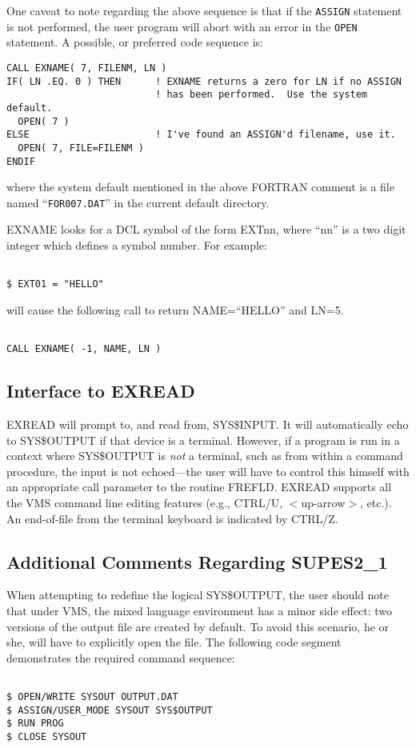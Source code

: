 One caveat to note regarding the above sequence is that if the \verb+ASSIGN+
statement is not performed,
the user program will abort with an error in the \verb+OPEN+ statement.
A possible,
or preferred code sequence is:
\begin{verbatim}
CALL EXNAME( 7, FILENM, LN )
IF( LN .EQ. 0 ) THEN      ! EXNAME returns a zero for LN if no ASSIGN
                          ! has been performed.  Use the system default.
  OPEN( 7 )
ELSE                      ! I've found an ASSIGN'd filename, use it.
  OPEN( 7, FILE=FILENM )
ENDIF
\end{verbatim}
where the system default mentioned in the above FORTRAN comment
is a file named ``\verb+FOR007.DAT+'' in the current
default directory.

EXNAME looks for a DCL symbol of the form EXTnn, where ``nn'' is a two digit
integer which defines a symbol number.  For example:
\begin{verbatim}

$ EXT01 = "HELLO"

\end{verbatim}
will cause the following call to return NAME=``HELLO'' and LN=5.
\begin{verbatim}

CALL EXNAME( -1, NAME, LN )

\end{verbatim}

\subsection{Interface to EXREAD}
EXREAD will prompt to,
and read from,
SYS\$INPUT.
It will automatically echo to SYS\$OUTPUT if that device is a terminal.
However,
if a program is run in a context where SYS\$OUTPUT is {\em not} a
terminal,
such as from within a command procedure,
the input is not echoed---the user will have to control this
himself with an appropriate call parameter to the routine FREFLD.
EXREAD supports all the VMS command line editing features (e.g., CTRL/U,
$<$up-arrow$>$, etc.).  An end-of-file from the terminal keyboard is
indicated by CTRL/Z.

\subsection{Additional Comments Regarding SUPES2\_1}
When attempting to redefine the logical SYS\$OUTPUT,
the user should note that under VMS,
the mixed language environment has a minor side effect:
two versions of the output file are created by default.
To avoid this scenario,
he or she,
will have to explicitly open the file.
The following code segment demonstrates the required command sequence:
\begin{verbatim}

$ OPEN/WRITE SYSOUT OUTPUT.DAT
$ ASSIGN/USER_MODE SYSOUT SYS$OUTPUT
$ RUN PROG
$ CLOSE SYSOUT

\end{verbatim}

